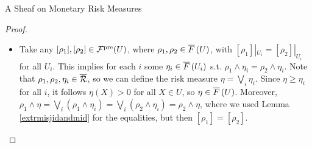 \begin{subsection}{A Sheaf on Monetary Risk Measures}
\begin{proof}
\begin{itemize}
\begin{itemize}
                    \item
                        Take any \( [\rho_1], [\rho_2] \in \mathcal{F}^{\text{pre}}(U) \), where \( \rho_1, \rho_2 \in \overline{F}\left (U \right) \), with \( [\rho_1]|_{U_i} = [\rho_2]|_{U_i} \)
                        for all \( U_i \). This implies for each \( i \) some \( \eta_i \in \overline{F}\left (U_i \right) \) s.t. \( \rho_1 \wedge \eta_i = \rho_2 \wedge \eta_i \). 
                        Note that \( \rho_1, \rho_2, \eta_i \in \overline{\mathcal{R}} \), so we can define the risk measure \( \eta = \bigvee_{i} \eta_i \). Since \( \eta \geq \eta_i \) 
                        for all \( i \), it follows \( \eta(X) > 0 \) for all \( X \in U \), so \( \eta \in \overline{F}\left (U \right) \). Moreover,
                        \( \rho_1 \wedge \eta = \bigvee_{i} (\rho_1 \wedge \eta_i) = \bigvee_{i} (\rho_2 \wedge \eta_i) = \rho_2 \wedge \eta \), where we used Lemma \ref{extrmisjidandmid}
                        for the equalities, but then \( [\rho_1] = [\rho_2] \).
                \end{itemize}
            

\end{itemize}
\end{proof}
\end{subsection}
